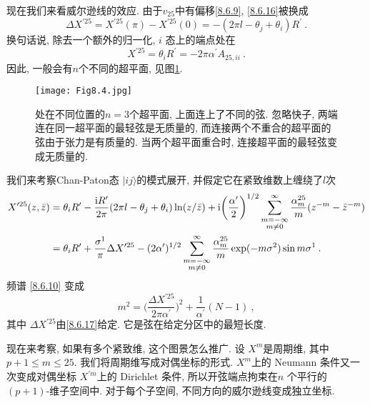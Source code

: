 现在我们来看威尔逊线的效应. 由于$v_{25}$中有偏移\eqref{8.6.9}, \eqref{8.6.16}被换成
\begin{equation}
	\Delta X^{\prime 25}=X^{\prime 25}(\pi)-X^{\prime 25}(0)=-(2 \pi l-\theta_{j}+\theta_{i}) R^{\prime} \:. \label{8.6.17}
\end{equation}
换句话说, 除去一个额外的归一化,  $i$ 态上的端点处在
\begin{equation}
	X^{\prime 25}=\theta_{i} R^{\prime}=-2 \pi \alpha^{\prime} A_{25, i i} \:. \label{8.6.18}
\end{equation}
因此, 一般会有$n$个不同的超平面, 见图\ref{Fig8.4}.

\begin{figure}[h!]
	\begin{center}
		\texttt{[image: Fig8.4.jpg]}
		\caption{处在不同位置的$n=3$个超平面, 上面连上了不同的弦. 忽略快子, 两端连在同一超平面的最轻弦是无质量的, 而连接两个不重合的超平面的弦由于张力是有质量的. 当两个超平面重合时, 连接超平面的最轻弦变成无质量的.}\label{Fig8.4}
	\end{center}
\end{figure}

我们来考察Chan-Paton态 $|i j\rangle$的模式展开, 并假定它在紧致维数上缠绕了$l$次
\begin{align}
	X^{\prime 25}(z, \bar{z}) &= \theta_{i} R^{\prime} - \frac{\mathrm{i} R^{\prime}}{2 \pi}(2 \pi l-\theta_{j}+\theta_{i}) 
	\ln (z / \bar{z}) + \mathrm{i} \biggl(\frac{\alpha^{\prime}}{2}\biggr)^{1/2} 
	\sum_{\substack{m=-\infty  \\  m \neq 0}}^{\infty} \frac{\alpha_{m}^{25}}{m}(z^{-m}-\bar{z}^{-m})  \nonumber \\
	&=\theta_{i} R^{\prime} + \frac{\sigma^{1}}{\pi} \Delta X^{\prime 25} - (2 \alpha^{\prime})^{1/2} 
	\sum_{\substack{m=-\infty  \\  m \neq 0}}^{\infty} \frac{\alpha_{m}^{25}}{m} \exp (-m \sigma^{2}) \sin m \sigma^{1} \:. \label{8.6.19}
\end{align}
频谱 \eqref{8.6.10} 变成
\begin{equation}
	m^{2}=\biggl(\frac{\Delta X^{\prime 25}}{2 \pi \alpha^{\prime}}\biggr)^{2}+\frac{1}{\alpha^{\prime}}(N-1) \:, \label{8.6.20}
\end{equation}
其中 $\Delta X^{\prime 25}$由\eqref{8.6.17}给定. 它是弦在给定分区中的最短长度.

现在来考察, 如果有多个紧致维, 这个图景怎么推广. 设 $X^{m}$是周期维, 其中 $p+1 \leq m \leq 25$. 我们将周期维写成对偶坐标的形式. 
$X^{m}$上的 Neumann 条件又一次变成对偶坐标 $X^{\prime m}$上的 Dirichlet 条件, 所以开弦端点拘束在$n$ 个平行的$(p+1)$-维子空间中. 
对于每个子空间, 不同方向的威尔逊线变成独立坐标.

